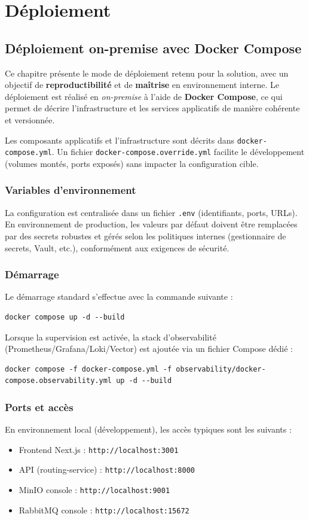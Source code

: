 \documentclass[12pt,a4paper]{report}
\begin{document}
\chapter{Déploiement}
\section{Déploiement on-premise avec Docker Compose}
Ce chapitre présente le mode de déploiement retenu pour la solution, avec un objectif de \textbf{reproductibilité} et de \textbf{maîtrise} en environnement interne. Le déploiement est réalisé en \textit{on-premise} à l’aide de \textbf{Docker Compose}, ce qui permet de décrire l’infrastructure et les services applicatifs de manière cohérente et versionnée.

Les composants applicatifs et l’infrastructure sont décrits dans \texttt{docker-compose.yml}. Un fichier \texttt{docker-compose.override.yml} facilite le développement (volumes montés, ports exposés) sans impacter la configuration cible.

\subsection{Variables d’environnement}
La configuration est centralisée dans un fichier \texttt{.env} (identifiants, ports, URLs). En environnement de production, les valeurs par défaut doivent être remplacées par des secrets robustes et gérés selon les politiques internes (gestionnaire de secrets, Vault, etc.), conformément aux exigences de sécurité.

\subsection{Démarrage}
Le démarrage standard s’effectue avec la commande suivante :

\begin{lstlisting}
docker compose up -d --build
\end{lstlisting}

Lorsque la supervision est activée, la stack d’observabilité (Prometheus/Grafana/Loki/Vector) est ajoutée via un fichier Compose dédié :

\begin{lstlisting}
docker compose -f docker-compose.yml -f observability/docker-compose.observability.yml up -d --build
\end{lstlisting}

\subsection{Ports et accès}
En environnement local (développement), les accès typiques sont les suivants :
\begin{itemize}
  \item Frontend Next.js : \texttt{http://localhost:3001}
  \item API (routing-service) : \texttt{http://localhost:8000}
  \item MinIO console : \texttt{http://localhost:9001}
  \item RabbitMQ console : \texttt{http://localhost:15672}
\end{itemize}
\end{document}
